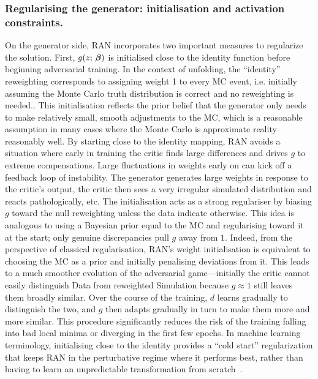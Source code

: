 {{        \subsubsection{Regularising the generator: initialisation and activation constraints.}
            On the generator side, RAN incorporates two important measures to regularize the solution.
            First, $g(z;\,\vb*\beta)$ is initialised close to the identity function before beginning adversarial training.
            In the context of unfolding, the ``identity'' reweighting corresponds to assigning weight 1 to every MC event, i.e. initially assuming the Monte Carlo truth distribution is correct and no reweighting is needed..
            This initialisation reflects the prior belief that the generator only needs to make relatively small, smooth adjustments to the MC, which is a reasonable assumption in many cases where the Monte Carlo is approximate reality reasonably well.
            By starting close to the identity mapping, RAN avoids a situation where early in training the critic finds large differences and drives $g$ to extreme compensations.
            Large fluctuations in weights early on can kick off a feedback loop of instability.
            The generator generates large weights in response to the critic's output, the critic then sees a very irregular simulated distribution and reacts pathologically, etc.
            The initialisation acts as a strong regulariser by biasing $g$ toward the null reweighting unless the data indicate otherwise.
            This idea is analogous to using a Bayesian prior equal to the MC and regularising toward it at the start; only genuine discrepancies pull $g$ away from \(1\).
            Indeed, from the perspective of classical regularisation, RAN's weight initialisation is equivalent to choosing the MC as a prior and initially penalising deviations from it.
            This leads to a much smoother evolution of the adversarial game---initially the critic cannot easily distinguish Data from reweighted Simulation because $g\approx 1$ still leaves them broadly similar.
            Over the course of the training, $d$ learns gradually to distinguish the two, and $g$ then adapts gradually in turn to make them more and more similar.
            This procedure significantly reduces the risk of the training falling into bad local minima or diverging in the first few epochs.
            In machine learning terminology, initialising close to the identity provides a ``cold start'' regularization that keeps RAN in the perturbative regime where it performs best, rather than having to learn an unpredictable transformation from scratch~\cite{houlsby_parameter-efficient_2019, pan_idinit_2025, zhao_zero_2022, Caselle2022StochasticTheory, jiang_algorithmic_2022}.

}}
